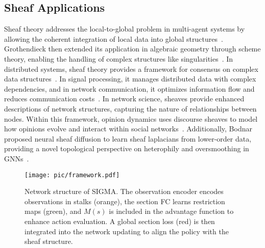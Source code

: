 \subsection{Sheaf Applications}
Sheaf theory addresses the local-to-global problem in multi-agent systems by allowing the coherent integration of local data into global structures~\cite{sheafori}. Grothendieck then extended its application in algebraic geometry through scheme theory, enabling the handling of complex structures like singularities~\cite{grothendieck1955general}. In distributed systems, sheaf theory provides a framework for consensus on complex data structures~\cite{hansen2020laplacians}. In signal processing, it manages distributed data with complex dependencies, and in network communication, it optimizes information flow and reduces communication costs~\cite{robinson2014topological}. In network science, sheaves provide enhanced descriptions of network structures, capturing the nature of relationships between nodes. Within this framework, opinion dynamics uses discourse sheaves to model how opinions evolve and interact within social networks~\cite{hansen2021opinion}. Additionally, Bodnar proposed neural sheaf diffusion to learn sheaf laplacians from lower-order data, providing a novel topological perspective on heterophily and oversmoothing in GNNs~\cite{bodnar2022neural,10872817,peng2023clgt}.


\begin{figure*}[t]
  \centering
  \texttt{[image: pic/framework.pdf]}
  \caption{Network structure of SIGMA. The observation encoder encodes observations in stalks (orange), the section FC learns restriction maps (green), and \(M(s)\) is included in the advantage function to enhance action evaluation. A global section loss (red) is then integrated into the network updating to align the policy with the sheaf structure.}
  \label{framework}
\end{figure*}